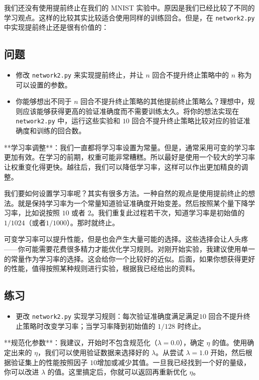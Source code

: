 我们还没有使用提前终止在我们的 MNIST 实验中。原因是我们已经比较了不同的学习观点。这样的比较其实比较适合使用同样的训练回合。但是，在 \lstinline!network2.py! 中实现提前终止还是很有价值的：

\subsection*{问题}

\begin{itemize}
\item 修改 \lstinline!network2.py! 来实现提前终止，并让 $n$ 回合不提升终止策略中的 $n$ 称为可以设置的参数。
\item 你能够想出不同于 $n$ 回合不提升终止策略的其他提前终止策略么？理想中，规则应该能够获得更高的验证准确度而不需要训练太久。将你的想法实现在 \lstinline!network2.py! 中，运行这些实验和 $10$ 回合不提升终止策略比较对应的验证准确度和训练的回合数。
\end{itemize}

**学习率调整**：我们一直都将学习率设置为常量。但是，通常采用可变的学习率更加有效。在学习的前期，权重可能非常糟糕。所以最好是使用一个较大的学习率让权重变化得更快。越往后，我们可以降低学习率，这样可以作出更加精良的调整。

我们要如何设置学习率呢？其实有很多方法。一种自然的观点是使用提前终止的想法。就是保持学习率为一个常量知道验证准确度开始变差。然后按照某个量下降学习率，比如说按照 $10$ 或者 $2$。我们重复此过程若干次，知道学习率是初始值的 $1/1024$（或者$1/1000$）。那时就终止。

可变学习率可以提升性能，但是也会产生大量可能的选择。这些选择会让人头疼——你可能需要花费很多精力才能优化学习规则。对刚开始实验，我建议使用单一的常量作为学习率的选择。这会给你一个比较好的近似。后面，如果你想获得更好的性能，值得按照某种规则进行实验，根据我已经给出的资料。

\subsection*{练习}

\begin{itemize}
\item 更改 \lstinline!network2.py! 实现学习规则：每次验证准确度满足满足$10$ 回合不提升终止策略时改变学习率；当学习率降到初始值的 $1/128$ 时终止。
\end{itemize}

**规范化参数**：我建议，开始时不包含规范化（$\lambda=0.0$），确定 $\eta$ 的值。使用确定出来的 $\eta$，我们可以使用验证数据来选择好的 $\lambda$。从尝试 $\lambda=1.0$ 开始，然后根据验证集上的性能按照因子 $10$增加或减少其值。一旦我已经找到一个好的量级，你可以改进 $\lambda$ 的值。这里搞定后，你就可以返回再重新优化 $\eta$。


